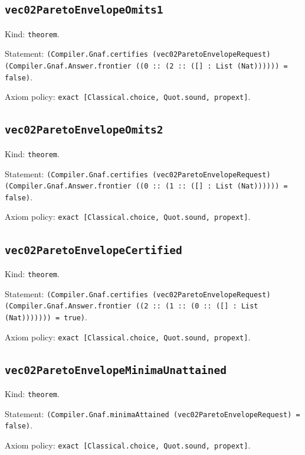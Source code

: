 \documentclass[11pt]{article}
\begin{document}
\subsection*{\texttt{vec02ParetoEnvelopeOmits1}}
\noindent Kind: \texttt{theorem}.\par
\noindent Statement: \texttt{(Compiler.Gnaf.certifies (vec02ParetoEnvelopeRequest) (Compiler.Gnaf.Answer.frontier ((0 :: (2 :: ([] : List (Nat)))))) = false)}.\par
\noindent Axiom policy: \texttt{exact [Classical.choice, Quot.sound, propext]}.\par
\subsection*{\texttt{vec02ParetoEnvelopeOmits2}}
\noindent Kind: \texttt{theorem}.\par
\noindent Statement: \texttt{(Compiler.Gnaf.certifies (vec02ParetoEnvelopeRequest) (Compiler.Gnaf.Answer.frontier ((0 :: (1 :: ([] : List (Nat)))))) = false)}.\par
\noindent Axiom policy: \texttt{exact [Classical.choice, Quot.sound, propext]}.\par
\subsection*{\texttt{vec02ParetoEnvelopeCertified}}
\noindent Kind: \texttt{theorem}.\par
\noindent Statement: \texttt{(Compiler.Gnaf.certifies (vec02ParetoEnvelopeRequest) (Compiler.Gnaf.Answer.frontier ((2 :: (1 :: (0 :: ([] : List (Nat))))))) = true)}.\par
\noindent Axiom policy: \texttt{exact [Classical.choice, Quot.sound, propext]}.\par
\subsection*{\texttt{vec02ParetoEnvelopeMinimaUnattained}}
\noindent Kind: \texttt{theorem}.\par
\noindent Statement: \texttt{(Compiler.Gnaf.minimaAttained (vec02ParetoEnvelopeRequest) = false)}.\par
\noindent Axiom policy: \texttt{exact [Classical.choice, Quot.sound, propext]}.\par
\end{document}
